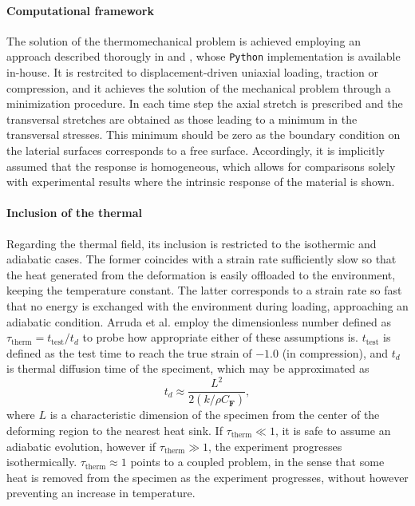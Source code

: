 \paragraph{Computational framework}
The solution of the thermomechanical problem is achieved employing an approach described thorougly in \cite{bergstromMechanicsSolidPolymers2015} and \cite{alvesFastOptimizationbasedParameter2022}, whose \verb|Python| implementation is available in-house.
It is restrcited to displacement-driven uniaxial loading, traction or compression, and it achieves the solution of the mechanical problem through a minimization procedure.
In each time step the axial stretch is prescribed and the transversal stretches are obtained as those leading to a minimum in the transversal stresses.
This minimum should be zero as the boundary condition on the laterial surfaces corresponds to a free surface.
Accordingly, it is implicitly assumed that the response is homogeneous, which allows for comparisons solely with experimental results where the intrinsic response of the material is shown.

\paragraph{Inclusion of the thermal}
Regarding the thermal field, its inclusion is restricted to the isothermic and adiabatic cases.
The former coincides with a strain rate sufficiently slow so that the heat generated from the deformation is easily offloaded to the environment, keeping the temperature constant.
The latter corresponds to a strain rate so fast that no energy is exchanged with the environment during loading, approaching an adiabatic condition.
Arruda et al. \citep{arrudaEffectsStrainRate1995} employ the dimensionless number defined as $\tau_\text{therm} = t_\text{test}/t_d$ to probe how appropriate either of these assumptions is.
$t_\text{test}$ is defined as the test time to reach the true strain of $-1.0$ (in compression), and $t_d$ is thermal diffusion time of the speciment, which may be approximated as
\begin{equation}
  t_d \approx \frac{L^2}{2(k/\rho C_\mathbf{F})},
\end{equation}
where $L$ is a characteristic dimension of the specimen from the center of the deforming region to the nearest heat sink.
If $\tau_\text{therm} \ll 1$, it is safe to assume an adiabatic evolution, however if $\tau_\text{therm}\gg 1$, the experiment progresses isothermically.
$\tau_\text{therm}\approx 1$ points to  a coupled problem, in the sense that some heat is removed from the specimen as the experiment progresses, without however preventing an increase in temperature.

